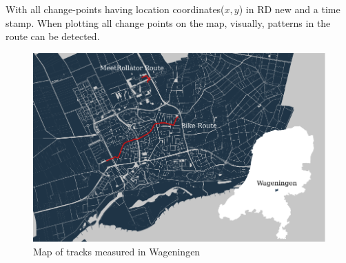 With all change-points having location coordinates($x,y$) in RD new and a time stamp. When plotting all change points on the map, visually, patterns in the route can be detected.

\begin{figure}[ht]
\includegraphics[width=\textwidth]{img/M_overviewRoute.pdf}
\centering
\caption{ Map of tracks measured in Wageningen\label{tracks}}
\end{figure}

